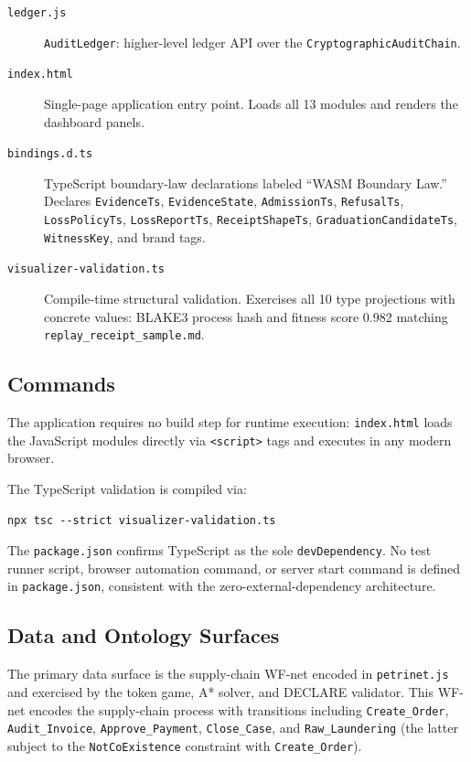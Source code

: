 \begin{description}
  \item[\texttt{ledger.js}] \texttt{AuditLedger}: higher-level ledger API over the
        \texttt{CryptographicAuditChain}.
  \item[\texttt{index.html}] Single-page application entry point. Loads all 13 modules and
        renders the dashboard panels.
  \item[\texttt{bindings.d.ts}] TypeScript boundary-law declarations labeled ``WASM Boundary Law.''
        Declares \texttt{EvidenceTs}, \texttt{EvidenceState}, \texttt{AdmissionTs},
        \texttt{RefusalTs}, \texttt{LossPolicyTs}, \texttt{LossReportTs},
        \texttt{ReceiptShapeTs}, \texttt{GraduationCandidateTs}, \texttt{WitnessKey}, and
        brand tags.
  \item[\texttt{visualizer-validation.ts}] Compile-time structural validation. Exercises all
        10 type projections with concrete values: BLAKE3 process hash and fitness score 0.982
        matching \texttt{replay\_receipt\_sample.md}.
\end{description}

\subsection{Commands}
\label{sec:experiments-visualizer-impl-commands}

The application requires no build step for runtime execution: \texttt{index.html} loads the
JavaScript modules directly via \texttt{<script>} tags and executes in any modern browser.

The TypeScript validation is compiled via:
\begin{verbatim}
npx tsc --strict visualizer-validation.ts
\end{verbatim}
The \texttt{package.json} confirms TypeScript as the sole \texttt{devDependency}. No test
runner script, browser automation command, or server start command is defined in
\texttt{package.json}, consistent with the zero-external-dependency architecture.

\subsection{Data and Ontology Surfaces}
\label{sec:experiments-visualizer-impl-data}

The primary data surface is the supply-chain WF-net encoded in \texttt{petrinet.js} and
exercised by the token game, A* solver, and DECLARE validator. This WF-net encodes the
supply-chain process with transitions including \texttt{Create\_Order}, \texttt{Audit\_Invoice},
\texttt{Approve\_Payment}, \texttt{Close\_Case}, and \texttt{Raw\_Laundering} (the latter
subject to the \texttt{NotCoExistence} constraint with \texttt{Create\_Order}).

